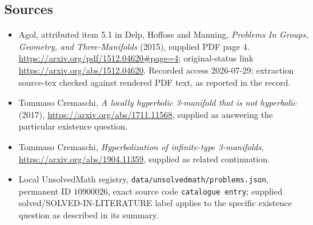 \documentclass[11pt]{article}
\begin{document}
\subsection{Sources}
\begin{itemize}
\item Agol, attributed item 5.1 in Delp, Hoffoss and Manning, \emph{Problems In Groups, Geometry, and Three-Manifolds} (2015), supplied PDF page 4. \url{https://arxiv.org/pdf/1512.04620#page=4}; original-status link \url{https://arxiv.org/abs/1512.04620}. Recorded access 2026-07-29; extraction source-tex checked against rendered PDF text, as reported in the record.
\item Tommaso Cremaschi, \emph{A locally hyperbolic 3-manifold that is not hyperbolic} (2017), \url{https://arxiv.org/abs/1711.11568}, supplied as answering the particular existence question.
\item Tommaso Cremaschi, \emph{Hyperbolization of infinite-type 3-manifolds}, \url{https://arxiv.org/abs/1904.11359}, supplied as related continuation.
\item Local UnsolvedMath registry, \texttt{data/unsolvedmath/problems.json}, permanent ID \(10900026\), exact source code \texttt{catalogue entry}; supplied solved/SOLVED-IN-LITERATURE label applies to the specific existence question as described in its summary.
\end{itemize}
\end{document}

